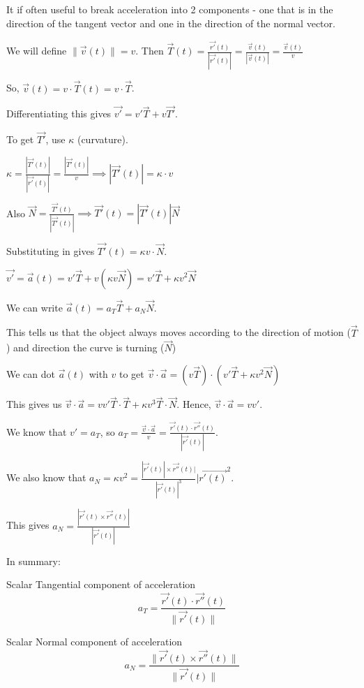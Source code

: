 \documentclass[../calc3.tex]{subfiles}
\begin{document}
It if often useful to break acceleration into 2 components - one that is in the direction of the tangent vector and one in the direction of the normal vector. 

We will define $\| \vec{v}(t)\| = v$. Then $\vec{T}(t)=\frac{\vec{r'}(t)}{| \vec{r'}(t)|}=\frac{\vec{v}(t)}{|\vec{v}(t)|} = \frac{\vec{v}(t)}{v}$

So, $\vec{v}(t)=v\cdot \vec{T}(t)=v\cdot \vec{T}$.

Differentiating this gives $\vec{v'}=v'\vec{T}+v\vec{T'}$.

To get $\vec{T'}$, use $\kappa$ (curvature).

$\kappa = \frac{|\vec{T'}(t)|}{|\vec{r'}(t)|}=\frac{|\vec{T'}(t)|}{v}\implies |\vec{T'}(t)|=\kappa\cdot v$

Also $\vec{N}=\frac{\vec{T'}(t)}{|\vec{T'}(t)|}\implies \vec{T'}(t)=|\vec{T'}(t)|\vec{N}$

Substituting in gives $\vec{T'}(t)=\kappa v\cdot \vec{N}$.

$\vec{v'}=\vec{a}(t)=v'\vec{T}+v(\kappa v \vec{N}) = v'\vec{T}+\kappa v^2 \vec{N}$

We can write $\vec{a}(t)= a_T \vec{T}+a_N \vec{N}$.

This tells us that the object always moves according to the direction of motion ($\vec{T}$) and direction the curve is turning ($\vec{N}$)

We can dot $\vec{a}(t)$ with $v$ to get $\vec{v}\cdot \vec{a}=(v\vec{T})\cdot(v'\vec{T}+\kappa v^2\vec{N})$

This gives us $\vec{v}\cdot \vec{a}=vv'\vec{T}\cdot \vec{T}+\kappa v^3\vec{T}\cdot \vec{N}$. Hence, $\vec{v}\cdot \vec{a}=vv'$.

We know that $v'=a_T$, so $a_T = \frac{\vec{v}\cdot \vec{a}}{v} = \frac{\vec{r'}(t)\cdot \vec{r''}(t)}{| \vec{r'}(t)|}$.

We also know that $a_N = \kappa v^2 = \frac{|\vec{r'}(t)|\times \vec{r''}(t)|}{|\vec{r'}(t)|^3}|\vec{r'(t)}^2$.

This gives $a_N = \frac{|\vec{r'}(t)\times \vec{r''}(t)|}{|\vec{r'}(t)|}$

In summary:

Scalar Tangential component of acceleration 
\[ a_T = \frac{\vec{r'}(t)\cdot \vec{r''}(t)}{\| \vec{r'}(t)\|} \]

Scalar Normal component of acceleration 
\[ a_N = \frac{\| \vec{r'}(t)\times \vec{r''}(t)\| }{\| \vec{r'}(t)\|} \]
\end{document}
